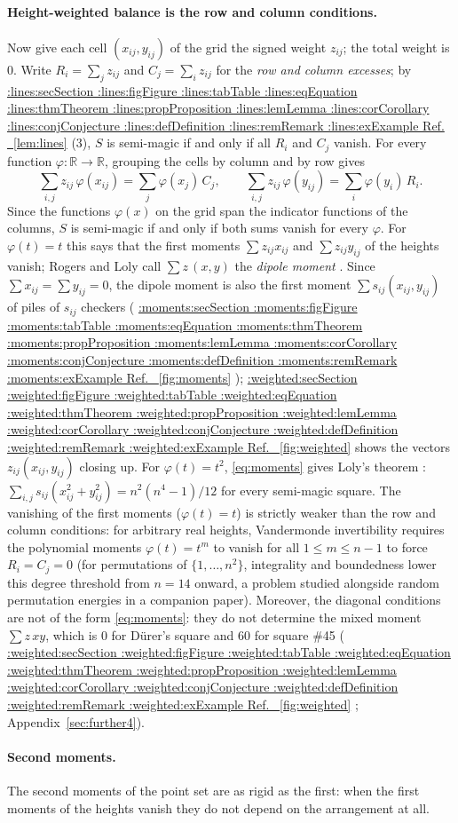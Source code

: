 \documentclass[11pt,a4paper]{article}
\makeatletter
\def\Cref@getprefix#1:#2\relax{#1}
\def\Cref@prefix@sec{sec}
\def\Cref@prefix@fig{fig}
\def\Cref@prefix@tab{tab}
\def\Cref@prefix@eq{eq}
\def\Cref@prefix@thm{thm}
\def\Cref@prefix@prop{prop}
\def\Cref@prefix@lem{lem}
\def\Cref@prefix@cor{cor}
\def\Cref@prefix@conj{conj}
\def\Cref@prefix@def{def}
\def\Cref@prefix@rem{rem}
\def\Cref@prefix@ex{ex}
\def\Cref@type@cap#1{%
  \edef\Cref@tmp{#1}%
  \ifx\Cref@tmp\Cref@prefix@sec Section%
  \else\ifx\Cref@tmp\Cref@prefix@fig Figure%
  \else\ifx\Cref@tmp\Cref@prefix@tab Table%
  \else\ifx\Cref@tmp\Cref@prefix@eq Equation%
  \else\ifx\Cref@tmp\Cref@prefix@thm Theorem%
  \else\ifx\Cref@tmp\Cref@prefix@prop Proposition%
  \else\ifx\Cref@tmp\Cref@prefix@lem Lemma%
  \else\ifx\Cref@tmp\Cref@prefix@cor Corollary%
  \else\ifx\Cref@tmp\Cref@prefix@conj Conjecture%
  \else\ifx\Cref@tmp\Cref@prefix@def Definition%
  \else\ifx\Cref@tmp\Cref@prefix@rem Remark%
  \else\ifx\Cref@tmp\Cref@prefix@ex Example%
  \else Ref.%
  \fi\fi\fi\fi\fi\fi\fi\fi\fi\fi\fi\fi
}
\DeclareRobustCommand{\Cref}[1]{%
  \begingroup
  \edef\Cref@label{#1}%
  \edef\Cref@prefix{\expandafter\Cref@getprefix\Cref@label:\relax}%
  \hyperref[#1]{\Cref@type@cap{\Cref@prefix}~\ref*{#1}}%
  \endgroup
}
\theoremstyle{plain}
\theoremstyle{definition}
\theoremstyle{remark}
\newcommand{\R}{\mathbb{R}}
\makeatother
\begin{document}
\paragraph{Height-weighted balance is the row and column conditions.}
Now give each cell $(x_{ij},y_{ij})$ of the grid the signed weight $z_{ij}$; the total weight is $0$.
Write $R_i=\sum_jz_{ij}$ and $C_j=\sum_iz_{ij}$ for the \emph{row and column excesses}; by \Cref{lem:lines}(3), $S$ is semi-magic if and only if all $R_i$ and $C_j$ vanish.
For every function $\varphi\colon\R\to\R$, grouping the cells by column and by row gives
\begin{equation}
\sum_{i,j}z_{ij}\,\varphi(x_{ij})=\sum_j\varphi(x_j)\,C_j,\qquad
\sum_{i,j}z_{ij}\,\varphi(y_{ij})=\sum_i\varphi(y_i)\,R_i .
\label{eq:moments}
\end{equation}
Since the functions $\varphi(x)$ on the grid span the indicator functions of the columns, $S$ is semi-magic if and only if both sums vanish for every $\varphi$.
For $\varphi(t)=t$ this says that the first moments $\sum z_{ij}x_{ij}$ and $\sum z_{ij}y_{ij}$ of the heights vanish; Rogers and Loly call $\sum z\,(x,y)$ the \emph{dipole moment} \cite{rogers2005multipole}.
Since $\sum x_{ij}=\sum y_{ij}=0$, the dipole moment is also the first moment $\sum s_{ij}(x_{ij},y_{ij})$ of piles of $s_{ij}$ checkers (\Cref{fig:moments}); \Cref{fig:weighted} shows the vectors $z_{ij}(x_{ij},y_{ij})$ closing up.
For $\varphi(t)=t^2$, \eqref{eq:moments} gives Loly's theorem \cite{loly2004invariance}: $\sum_{i,j}s_{ij}(x_{ij}^2+y_{ij}^2)=n^2(n^4-1)/12$ for every semi-magic square.
The vanishing of the first moments ($\varphi(t)=t$) is strictly weaker than the row and column conditions: for arbitrary real heights, Vandermonde invertibility requires the polynomial moments $\varphi(t)=t^m$ to vanish for all $1\le m\le n-1$ to force $R_i=C_j=0$ (for permutations of $\{1,\dots,n^2\}$, integrality and boundedness lower this degree threshold from $n=14$ onward, a problem studied alongside random permutation energies in a companion paper).
Moreover, the diagonal conditions are not of the form \eqref{eq:moments}: they do not determine the mixed moment $\sum z\,xy$, which is $0$ for D\"urer's square and $60$ for square \#45 (\Cref{fig:weighted}; Appendix~\ref{sec:further4}).

\paragraph{Second moments.}
The second moments of the point set are as rigid as the first: when the first moments of the heights vanish they do not depend on the arrangement at all.
\end{document}
